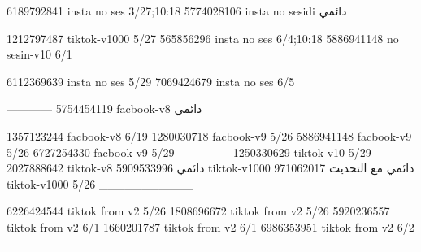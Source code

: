 
6189792841 insta no ses
3/27;10:18
5774028106 insta no sesidi
دائمي

1212797487 tiktok-v1000
5/27
565856296 insta no ses
6/4;10:18
5886941148 no sesin-v10
6/1

6112369639 insta no ses
5/29
7069424679 insta no ses
6/5

------------
5754454119 facbook-v8
دائمي

1357123244 facbook-v8
6/19
1280030718 facbook-v9
5/26
5886941148 facbook-v9
5/26
6727254330 facbook-v9
5/29
--------------
1250330629 tiktok-v10
5/29
2027888642 tiktok-v8
دائمي
5909533996 tiktok-v1000
دائمي مع التحديث
971062017 tiktok-v1000
5/26
___________

6226424544 tiktok from v2
5/26
1808696672 tiktok from v2
5/26
5920236557 tiktok from v2
6/1
1660201787 tiktok from v2
6/1
 6986353951 tiktok from v2
6/2
---------
